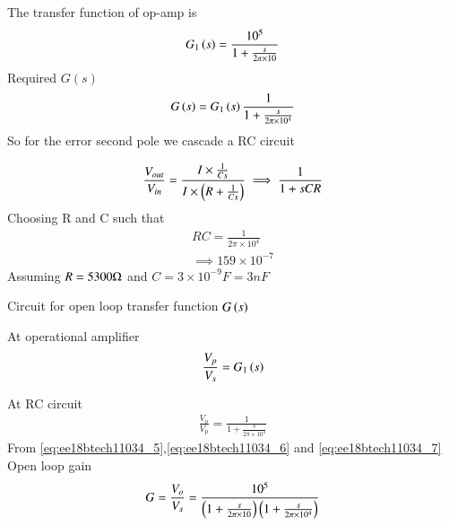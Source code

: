 \begin{enumerate}[label=\thesubsection.\arabic*.,ref=\thesubsection.\theenumi]
The transfer function of op-amp is
\begin{align}
    G_{1}\brak{s} = \frac{10^{5}}{1+\frac{s}{2\pi \times 10}}
\label{eq:ee18btech11034_5}
\end{align}
Required $G(s)$
\begin{align}
    G\left(s\right) = G_{1}\left(s\right)\frac{1}{1+\frac{s}{2\pi \times 10^{4}}}
\end{align}
So for the error second pole we cascade a RC circuit
\begin{figure}[ht!]
	\begin{center}
		\resizebox{\columnwidth/2}{!}{}
	\end{center}
	\caption{}
	\label{fig:ee18btech11034_figa}
\end{figure}
\begin{align}
\frac{V_{out}}{V_{in}} = \frac{I \times \frac{1}{Cs}}{I \times \left(R+\frac{1}{Cs}\right)}
\implies \frac{1}{1+sCR}
\end{align}
Choosing R and C such that
\begin{align}
RC  = \frac{1}{2\pi \times 10^{4}}
\\
\implies 159 \times 10^{-7}
\end{align}
Assuming $R = 5300 \ohm$ and $C=3 \times 10^{-9}F = 3nF$ 

Circuit for open loop transfer function $G\left(s\right)$
\begin{figure}[ht!]
	\begin{center}
		\resizebox{\columnwidth}{!}{}
	\end{center}
	\caption{}
	\label{fig:ee18btech11034_figb}
\end{figure}

At operational amplifier
\begin{align}
\frac{V_{p}}{V_{s}} = G_{1}\brak{s}
\label{eq:ee18btech11034_6}
\end{align}

At RC circuit
\begin{align}
\frac{V_{o}}{V_{p}} = \frac{1}{1+\frac{s}{2\pi \times 10^{4}}}
\label{eq:ee18btech11034_7}
\end{align}
From \eqref{eq:ee18btech11034_5},\eqref{eq:ee18btech11034_6} and \eqref{eq:ee18btech11034_7}
Open loop gain 
\begin{align}
G = \frac{V_{o}}{V_{s}} = \frac{10^{5}}{\left(1+\frac{s}{2\pi \times 10}\right)\left(1+\frac{s}{2\pi \times 10^{4}}\right)}
\end{align}


\end{enumerate}
